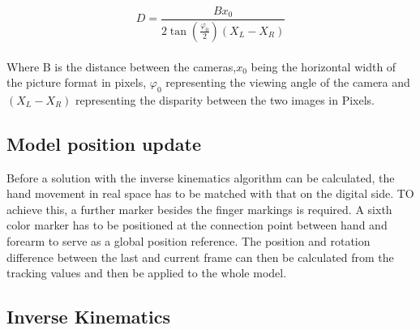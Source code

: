 \begin{equation}
D=\frac{Bx_0}{2\tan(\frac{\varphi_0}{2})(X_{L}-X_{R})}
\end{equation}\\
Where B is the distance between the cameras,$x_0$ being the horizontal width of the picture format in pixels, $\varphi_0$ representing the viewing angle of the camera and $(X_{L}-X_{R})$ representing the disparity between the two images in Pixels.
\subsection{Model position update}
Before a solution with the inverse kinematics algorithm can be calculated, the hand movement in real space has to be matched with that on the digital side. TO achieve this, a further marker besides the finger markings is required. A sixth color marker has to be positioned at the connection point between hand and forearm to serve as a global position reference. The position and rotation difference between the last and current frame can then be calculated from the tracking values and then be applied to the whole model.
\subsection{Inverse Kinematics}

